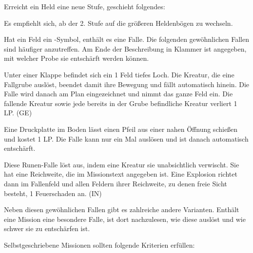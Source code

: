 {		
			Erreicht ein Held eine neue Stufe, geschieht folgendes:


			\noindent
			Es empfiehlt sich, ab der 2. Stufe auf die größeren Heldenbögen zu wechseln.

	\columnbreak

		Hat ein Feld ein \trap-Symbol, enthält es eine Falle. Die folgenden gewöhnlichen Fallen sind häufiger anzutreffen. Am Ende der Beschreibung in Klammer ist angegeben, mit welcher Probe sie entschärft werden können.

		 Unter einer Klappe befindet sich ein 1 Feld tiefes Loch. Die Kreatur, die eine Fallgrube auslöst, beendet damit ihre Bewegung und fällt automatisch hinein. Die Falle wird danach am Plan eingezeichnet und nimmt das ganze Feld ein. Die fallende Kreatur sowie jede bereits in der Grube befindliche Kreatur verliert 1 LP. (GE)

		 Eine Druckplatte im Boden lässt einen Pfeil aus einer nahen Öffnung schießen und kostet 1 LP. Die Falle kann nur ein Mal auslösen und ist danach automatisch entschärft.

		 Diese Runen-Falle löst aus, indem eine Kreatur sie unabsichtlich verwischt. Sie hat eine Reichweite, die im Missionstext angegeben ist. Eine Explosion richtet dann im Fallenfeld und allen Feldern ihrer Reichweite, zu denen freie Sicht besteht, 1 Feuerschaden an. (IN)

		Neben diesen gewöhnlichen Fallen gibt es zahlreiche andere Varianten. Enthält eine Mission eine besondere Falle, ist dort nachzulesen, wie diese auslöst und wie schwer sie zu entschärfen ist.

		Selbstgeschriebene Missionen sollten folgende Kriterien erfüllen:

}
